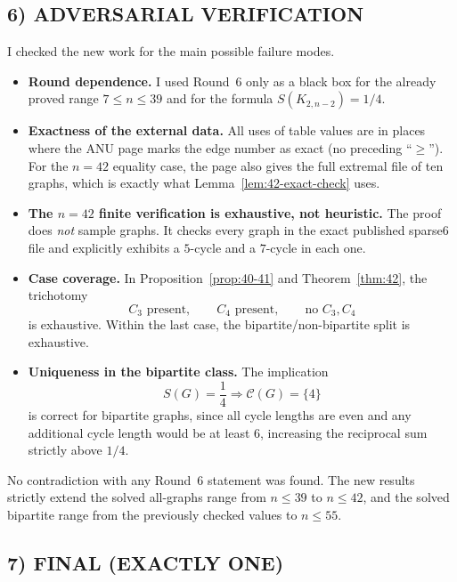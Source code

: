 \subsection*{6) ADVERSARIAL VERIFICATION}

I checked the new work for the main possible failure modes.

\begin{itemize}
\item \textbf{Round dependence.}
I used Round~6 only as a black box for the already proved range $7\le n\le 39$ and for the formula $S(K_{2,n-2})=1/4$.

\item \textbf{Exactness of the external data.}
All uses of table values are in places where the ANU page marks the edge number as exact (no preceding ``$\ge$'').
For the $n=42$ equality case, the page also gives the full extremal file of ten graphs, which is exactly what Lemma~\ref{lem:42-exact-check} uses.

\item \textbf{The $n=42$ finite verification is exhaustive, not heuristic.}
The proof does \emph{not} sample graphs.
It checks every graph in the exact published sparse6 file and explicitly exhibits a $5$-cycle and a $7$-cycle in each one.

\item \textbf{Case coverage.}
In Proposition~\ref{prop:40-41} and Theorem~\ref{thm:42}, the trichotomy
\[
C_3\text{ present},\qquad C_4\text{ present},\qquad \text{no }C_3,C_4
\]
is exhaustive.
Within the last case, the bipartite/non-bipartite split is exhaustive.

\item \textbf{Uniqueness in the bipartite class.}
The implication
\[
S(G)=\frac14\Longrightarrow \mathcal C(G)=\{4\}
\]
is correct for bipartite graphs, since all cycle lengths are even and any additional cycle length would be at least $6$, increasing the reciprocal sum strictly above $1/4$.
\end{itemize}

No contradiction with any Round~6 statement was found.
The new results strictly extend the solved all-graphs range from $n\le 39$ to $n\le 42$, and the solved bipartite range from the previously checked values to $n\le 55$.

\subsection*{7) FINAL (EXACTLY ONE)}

